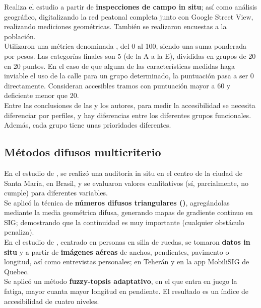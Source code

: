 Realiza el estudio a partir de \textbf{inspecciones de campo in situ}; así como análisis geográfico, digitalizando la red peatonal completa junto con Google Street View, realizando mediciones geométricas.
También se realizaron encuestas a la población.
\\

Utilizaron una métrica denominada , del 0 al 100, siendo una suma ponderada por pesos. Las categorías finales son 5 (de la A a la E), divididas en grupos de 20 en 20 puntos.
En el caso de que alguna de las características medidas haga inviable el uso de la calle para un grupo determinado, la puntuación pasa a ser 0 directamente. Consideran accesibles tramos con puntuación mayor a 60 y deficiente menor que 20.
\\

Entre las conclusiones de las y los autores, para medir la accesibilidad se necesita diferenciar por perfiles, y hay diferencias entre los diferentes grupos funcionales. Además, cada grupo tiene unas prioridades diferentes.
\\

\subsection{Métodos difusos multicriterio}
\label{subsec:eval-difusos}

En el estudio de \textcite{soaresmuller2024}, se realizó una auditoría in situ en el centro de la ciudad de Santa María, en Brasil, y se evaluaron valores cualitativos (sí, parcialmente, no cumple) para diferentes variables.
\\

Se aplicó la técnica de \textbf{números difusos triangulares ()}, agregándolas mediante la media geométrica difusa, generando mapas de gradiente continuo en SIG; demostrando que la continuidad es muy importante (cualquier obstáculo penaliza).
\\

En el estudio de \textcite{jahromi2024}, centrado en personas en silla de ruedas, se tomaron \textbf{datos in situ} y a partir de \textbf{imágenes aéreas} de anchos, pendientes, pavimento o longitud, así como entrevistas personales; en Teherán y en la app MobiliSIG de Quebec.
\\

Se aplicó un método \textbf{\gls{fuzzy-topsis} adaptativo}, en el que entra en juego la fatiga, mayor cuanta mayor longitud en pendiente. El resultado es un índice de accesibilidad de cuatro niveles.
\\

